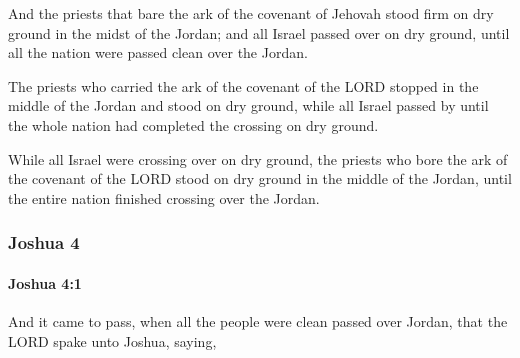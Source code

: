 			\begin{versebox}
					\item[BHS] 
					\item[ASV] And the priests that bare the ark of the covenant of Jehovah stood firm on dry ground in the midst of the Jordan; and all Israel passed over on dry ground, until all the nation were passed clean over the Jordan.
					\item[NIV] The priests who carried the ark of the covenant of the LORD stopped in the middle of the Jordan and stood on dry ground, while all Israel passed by until the whole nation had completed the crossing on dry ground.
					\item[NRSV] While all Israel were crossing over on dry ground, the priests who bore the ark of the covenant of the LORD stood on dry ground in the middle of the Jordan, until the entire nation finished crossing over the Jordan.
			\end{versebox}
	\subsubsection{Joshua 4} %
		\label{JOSHUA-4}

		\paragraph{Joshua 4:1} %
			\label{JOSHUA-4-1}

			And it came to pass, when all the people were clean passed over Jordan, that the LORD spake unto Joshua, saying,

